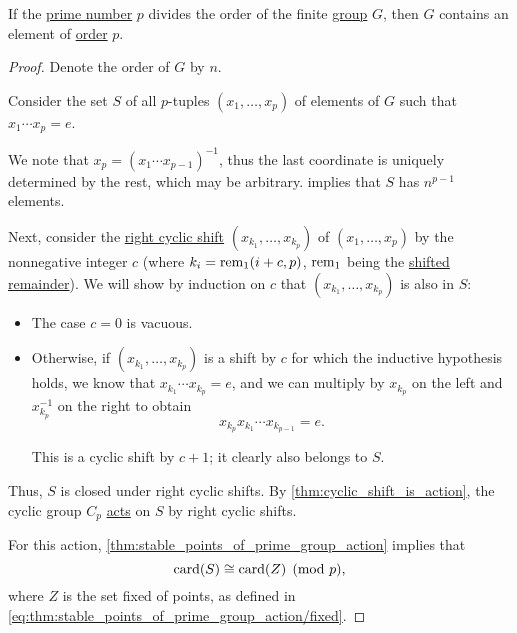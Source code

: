 \begin{theorem}\label{thm:cauchys_subgroup_theorem}
  If the \hyperref[def:prime_number]{prime number} \( p \) divides the order of the finite \hyperref[def:group]{group} \( G \), then \( G \) contains an element of \hyperref[def:group_element_order]{order} \( p \).
\end{theorem}
\begin{proof}
  Denote the order of \( G \) by \( n \).

  Consider the set \( S \) of all \( p \)-tuples \( (x_1, \ldots, x_p) \) of elements of \( G \) such that \( x_1 \cdots x_p = e \).

  We note that \( x_p = (x_1 \cdots x_{p-1})^{-1} \), thus the last coordinate is uniquely determined by the rest, which may be arbitrary.  implies that \( S \) has \( n^{p-1} \) elements.

  Next, consider the \hyperref[def:cyclic_shift]{right cyclic shift} \( (x_{k_1}, \ldots, x_{k_p}) \) of \( (x_1, \ldots, x_p) \) by the nonnegative integer \( c \) (where \( k_i = \operatorname{rem}_1(i + c, p) \), \( \operatorname{rem}_1 \) being the \hyperref[def:shifted_remainder]{shifted remainder}). We will show by induction on \( c \) that \( (x_{k_1}, \ldots, x_{k_p}) \) is also in \( S \):
  \begin{itemize}
    \item The case \( c = 0 \) is vacuous.
    \item Otherwise, if \( (x_{k_1}, \ldots, x_{k_p}) \) is a shift by \( c \) for which the inductive hypothesis holds, we know that \( x_{k_1} \cdots x_{k_p} = e \), and we can multiply by \( x_{k_p} \) on the left and \( x_{k_p}^{-1} \) on the right to obtain
    \begin{equation*}
      x_{k_p} x_{k_1} \cdots x_{k_{p-1}} = e.
    \end{equation*}

    This is a cyclic shift by \( c + 1 \); it clearly also belongs to \( S \).
  \end{itemize}

  Thus, \( S \) is closed under right cyclic shifts. By \cref{thm:cyclic_shift_is_action}, the cyclic group \( C_p \) \hyperref[def:group_action]{acts} on \( S \) by right cyclic shifts.

  For this action, \cref{thm:stable_points_of_prime_group_action} implies that
  \begin{equation*}
    \operatorname{card}(S) \cong \operatorname{card}(Z) \pmod p,
  \end{equation*}
  where \( Z \) is the set fixed of points, as defined in \eqref{eq:thm:stable_points_of_prime_group_action/fixed}.


\end{proof}
